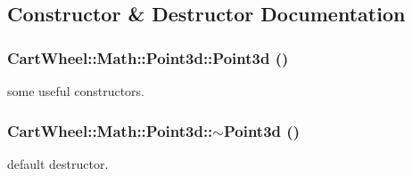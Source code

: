 \subsection{Constructor \& Destructor Documentation}
\hypertarget{classCartWheel_1_1Math_1_1Point3d_af235f71d169b07977561cf3fdf560604}{
\subsubsection[{Point3d}]{\setlength{\rightskip}{0pt plus 5cm}CartWheel::Math::Point3d::Point3d ()}}
\label{classCartWheel_1_1Math_1_1Point3d_af235f71d169b07977561cf3fdf560604}
some useful constructors. \hypertarget{classCartWheel_1_1Math_1_1Point3d_a95a6847d70d5e7f1e89977f34b9d561c}{
\subsubsection[{$\sim$Point3d}]{\setlength{\rightskip}{0pt plus 5cm}CartWheel::Math::Point3d::$\sim$Point3d ()}}
\label{classCartWheel_1_1Math_1_1Point3d_a95a6847d70d5e7f1e89977f34b9d561c}
default destructor. 

